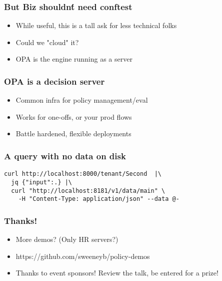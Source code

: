 \documentclass{beamer}
\begin{document}
\begin{frame}
\frametitle{But Biz shouldn\'t need conftest}
\begin{itemize}
  \item While useful, this is a tall ask for less technical folks
  \item Could we "cloud" it?
  \item OPA is the engine running as a server
\end{itemize}
\end{frame}

\begin{frame}
\frametitle{OPA is a decision server\footnotemark}
\begin{itemize}
  \item Common infra for policy management/eval 
  \item Works for one-offs, or your prod flows
  \item Battle hardened, flexible deployments
\end{itemize}
\end{frame}

\begin{frame}[fragile]
\frametitle{A query with no data on disk}
\begin{verbatim}
curl http://localhost:8000/tenant/Second  |\
  jq {"input":.} |\
  curl "http://localhost:8181/v1/data/main" \
    -H "Content-Type: application/json" --data @-
\end{verbatim}
\end{frame}

\begin{frame}
\frametitle{Thanks!}
\begin{itemize}
  \item More demos? (Only HR servers?)
  \item https://github.com/sweeneyb/policy-demos
  \item Thanks to event sponsors! Review the talk, be entered for a prize!
\end{itemize}
\end{frame}
\end{document}
